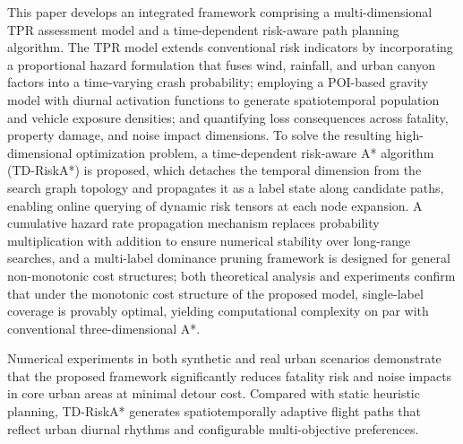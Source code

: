 This paper develops an integrated framework comprising a multi-dimensional TPR assessment model and a time-dependent risk-aware path planning algorithm. The TPR model extends conventional risk indicators by incorporating a proportional hazard formulation that fuses wind, rainfall, and urban canyon factors into a time-varying crash probability; employing a POI-based gravity model with diurnal activation functions to generate spatiotemporal population and vehicle exposure densities; and quantifying loss consequences across fatality, property damage, and noise impact dimensions. To solve the resulting high-dimensional optimization problem, a time-dependent risk-aware A* algorithm (TD-RiskA*) is proposed, which detaches the temporal dimension from the search graph topology and propagates it as a label state along candidate paths, enabling online querying of dynamic risk tensors at each node expansion. A cumulative hazard rate propagation mechanism replaces probability multiplication with addition to ensure numerical stability over long-range searches, and a multi-label dominance pruning framework is designed for general non-monotonic cost structures; both theoretical analysis and experiments confirm that under the monotonic cost structure of the proposed model, single-label coverage is provably optimal, yielding computational complexity on par with conventional three-dimensional A*.

Numerical experiments in both synthetic and real urban scenarios demonstrate that the proposed framework significantly reduces fatality risk and noise impacts in core urban areas at minimal detour cost. Compared with static heuristic planning, TD-RiskA* generates spatiotemporally adaptive flight paths that reflect urban diurnal rhythms and configurable multi-objective preferences.